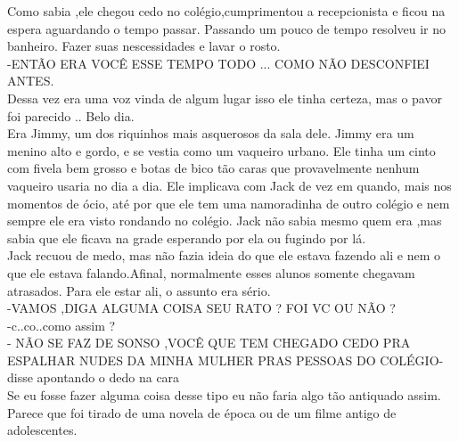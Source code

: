 \documentclass{book}
\begin{document}
 Como sabia ,ele chegou cedo no colégio,cumprimentou a recepcionista e ficou na espera aguardando o tempo passar. Passando um pouco de tempo resolveu ir no banheiro. Fazer suas nescessidades e lavar o rosto.\\
 -ENTÃO ERA VOCÊ ESSE TEMPO TODO ... COMO NÃO DESCONFIEI ANTES.\\
 Dessa vez era uma voz vinda de algum lugar isso ele tinha certeza, mas o pavor foi parecido .. Belo dia.\\
 Era Jimmy, um dos riquinhos mais asquerosos da sala dele. Jimmy era um menino alto e gordo, e se vestia como um vaqueiro urbano. Ele tinha um cinto com fivela bem grosso e botas de bico tão caras que provavelmente nenhum vaqueiro usaria no dia a dia. Ele implicava com Jack de vez em quando, mais nos momentos de ócio, até por que ele tem uma namoradinha de outro colégio e nem sempre ele era visto rondando no colégio. Jack não sabia mesmo quem era ,mas sabia que ele ficava na grade esperando por ela ou fugindo por lá.\\
 Jack recuou de medo, mas não fazia ideia do que ele estava fazendo ali e nem o que ele estava falando.Afinal, normalmente esses alunos somente chegavam atrasados. Para ele estar ali, o assunto era sério.\\
 
 -VAMOS ,DIGA ALGUMA COISA SEU RATO ? FOI VC OU NÃO ? \\
-c..co..como assim ? \\
- NÃO SE FAZ DE SONSO ,VOCÊ QUE TEM CHEGADO CEDO PRA ESPALHAR NUDES DA MINHA MULHER PRAS PESSOAS DO COLÉGIO-disse apontando o dedo na cara   \\

Se eu fosse fazer alguma coisa desse tipo eu não faria algo tão antiquado assim. Parece que foi tirado de uma novela de época ou de um filme antigo de adolescentes. \\
\end{document}
